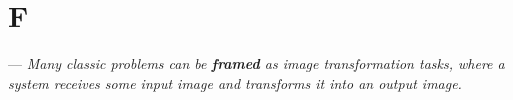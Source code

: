 \section{F}


 --- \textit{Many classic problems can be \textbf{framed} as image transformation tasks, where a system receives some input image and transforms it into an output image.}


